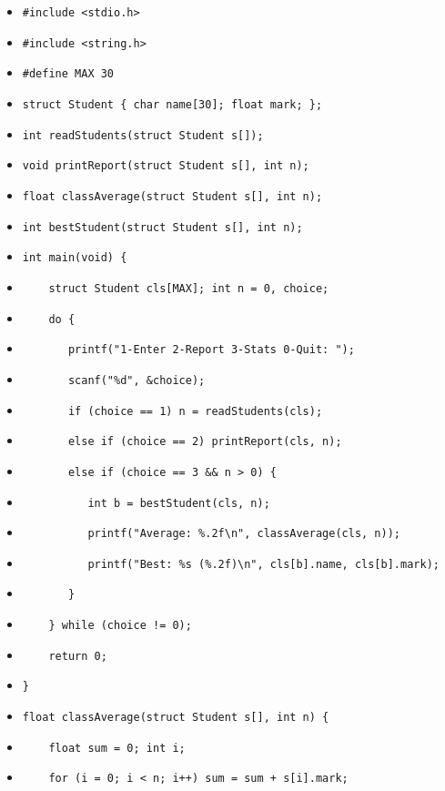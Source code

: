\documentclass[11pt]{article}
\begin{document}
\begin{exemplebox}
\begin{itemize}
\item[] \texttt{\#include <stdio.h>}
\item[] \texttt{\#include <string.h>}
\item[] \texttt{\#define MAX 30}
\item[] \texttt{struct Student \{ char name[30]; float mark; \};}
\item[] \texttt{int readStudents(struct Student s[]);}
\item[] \texttt{void printReport(struct Student s[], int n);}
\item[] \texttt{float classAverage(struct Student s[], int n);}
\item[] \texttt{int bestStudent(struct Student s[], int n);}
\item[] \texttt{int main(void) \{}
\item[] \texttt{\ \ \ \ struct Student cls[MAX]; int n = 0, choice;}
\item[] \texttt{\ \ \ \ do \{}
\item[] \texttt{\ \ \ \ \ \ \ printf("1-Enter 2-Report 3-Stats 0-Quit: ");}
\item[] \texttt{\ \ \ \ \ \ \ scanf("\%d", \&choice);}
\item[] \texttt{\ \ \ \ \ \ \ if (choice == 1) n = readStudents(cls);}
\item[] \texttt{\ \ \ \ \ \ \ else if (choice == 2) printReport(cls, n);}
\item[] \texttt{\ \ \ \ \ \ \ else if (choice == 3 \&\& n > 0) \{}
\item[] \texttt{\ \ \ \ \ \ \ \ \ \ int b = bestStudent(cls, n);}
\item[] \texttt{\ \ \ \ \ \ \ \ \ \ printf("Average: \%.2f\textbackslash n", classAverage(cls, n));}
\item[] \texttt{\ \ \ \ \ \ \ \ \ \ printf("Best: \%s (\%.2f)\textbackslash n", cls[b].name, cls[b].mark);}
\item[] \texttt{\ \ \ \ \ \ \ \}}
\item[] \texttt{\ \ \ \ \} while (choice != 0);}
\item[] \texttt{\ \ \ \ return 0;}
\item[] \texttt{\}}
\item[] \texttt{float classAverage(struct Student s[], int n) \{}
\item[] \texttt{\ \ \ \ float sum = 0; int i;}
\item[] \texttt{\ \ \ \ for (i = 0; i < n; i++) sum = sum + s[i].mark;}

\end{itemize}
\end{exemplebox}
\end{document}
